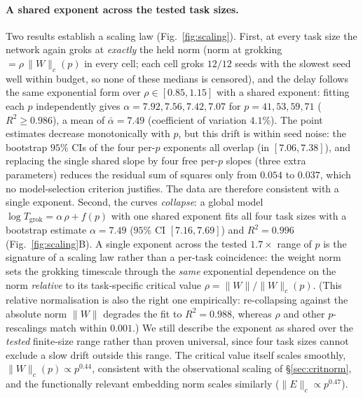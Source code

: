 \documentclass[10pt,twocolumn]{article}
\newcommand{\Wc}{\|W\|_{c}}
\newcommand{\Tgrok}{T_{\mathrm{grok}}}
\begin{document}
\paragraph{A shared exponent across the tested task sizes.}
Two results establish a scaling law (Fig.~\ref{fig:scaling}). First, at every task size the network again
groks at \emph{exactly} the held norm (norm at grokking $=\rho\,\Wc(p)$ in every cell; each cell groks
$12/12$ seeds with the slowest seed well within budget, so none of these medians is censored), and the delay
follows the same exponential form over $\rho\in[0.85,1.15]$ with a shared exponent: fitting each
$p$ independently gives $\alpha=7.92,7.56,7.42,7.07$ for $p=41,53,59,71$ ($R^2\ge0.986$), a mean of
$\bar\alpha=7.49$ (coefficient of variation $4.1\%$). The point estimates decrease monotonically with $p$,
but this drift is within seed noise: the bootstrap $95\%$ CIs of the four per-$p$ exponents all overlap (in
$[7.06,7.38]$), and replacing the single shared slope by four free per-$p$ slopes (three extra parameters)
reduces the residual sum of squares only from $0.054$ to $0.037$, which no model-selection criterion
justifies. The data are therefore consistent with a single exponent. Second, the curves \emph{collapse}: a
global model $\log\Tgrok=\alpha\,\rho+f(p)$ with one shared exponent fits all four task sizes with a
bootstrap estimate $\alpha=7.49$ ($95\%$ CI $[7.16,7.69]$) and $R^2=0.996$ (Fig.~\ref{fig:scaling}B). A
single exponent across the tested $1.7\times$ range of $p$ is the signature of a scaling law rather than a
per-task coincidence: the weight norm sets the grokking timescale through the \emph{same} exponential
dependence on the norm \emph{relative} to its task-specific critical value $\rho=\|W\|/\Wc(p)$. (This
relative normalisation is also the right one empirically: re-collapsing against the absolute norm $\|W\|$
degrades the fit to $R^2=0.988$, whereas $\rho$ and other $p$-rescalings match within $0.001$.) We still
describe the exponent as shared over the \emph{tested} finite-size range rather than proven universal, since
four task sizes cannot exclude a slow drift outside this range. The critical value itself scales smoothly,
$\Wc(p)\propto p^{0.44}$, consistent with the observational scaling of \S\ref{sec:critnorm}, and the
functionally relevant embedding norm scales similarly ($\|E\|_c\propto p^{0.47}$).
\end{document}
